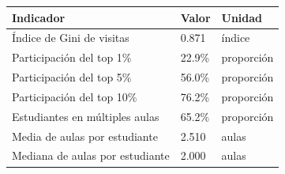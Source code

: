 \begin{tabular}{lll}
\toprule
Indicador & Valor & Unidad \\
\midrule
Índice de Gini de visitas & 0.871 & índice \\
Participación del top 1\% & 22.9\% & proporción \\
Participación del top 5\% & 56.0\% & proporción \\
Participación del top 10\% & 76.2\% & proporción \\
Estudiantes en múltiples aulas & 65.2\% & proporción \\
Media de aulas por estudiante & 2.510 & aulas \\
Mediana de aulas por estudiante & 2.000 & aulas \\
\bottomrule
\end{tabular}

